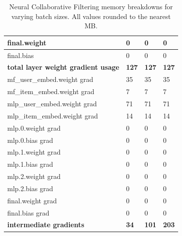 \documentclass[12pt,letterpaper]{article}
\begin{document}
\begin{table}[H]
{\begin{tabular}{|l|l|l|l|}
final.weight                      & 0                          & 0                          & 0                           \\ \hline
final.bias                        & 0                          & 0                          & 0                           \\ \hline
\textbf{total layer weight gradient usage}     & \textbf{127}                        & \textbf{127}                        & \textbf{127}                         \\ \hline
mf\_user\_embed.weight grad       & 35                         & 35                         & 35                          \\ \hline
mf\_item\_embed.weight grad       & 7                          & 7                          & 7                           \\ \hline
mlp\_user\_embed.weight grad      & 71                         & 71                         & 71                          \\ \hline
mlp\_item\_embed.weight grad      & 14                         & 14                         & 14                          \\ \hline
mlp.0.weight grad                 & 0                          & 0                          & 0                           \\ \hline
mlp.0.bias grad                   & 0                          & 0                          & 0                           \\ \hline
mlp.1.weight grad                 & 0                          & 0                          & 0                           \\ \hline
mlp.1.bias grad                   & 0                          & 0                          & 0                           \\ \hline
mlp.2.weight grad                 & 0                          & 0                          & 0                           \\ \hline
mlp.2.bias grad                   & 0                          & 0                          & 0                           \\ \hline
final.weight grad                 & 0                          & 0                          & 0                           \\ \hline
final.bias grad                   & 0                          & 0                          & 0                           \\ \hline
\textbf{intermediate gradients}                & \textbf{34}                         & \textbf{101}                        & \textbf{203}                         \\ \hline
\end{tabular}}
\caption{Neural Collaborative Filtering memory breakdowns for varying batch sizes. All values rounded to the nearest MB.}
\label{table:ncf_full_breakdown}
\end{table}
\end{document}
